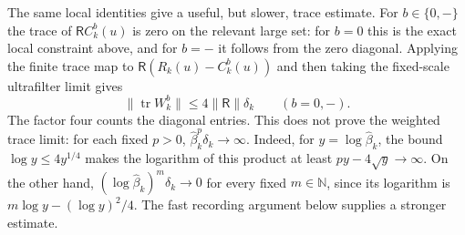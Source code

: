 The same local identities give a useful, but slower, trace estimate. For
$b\in\{0,-\}$ the trace of $\mathsf R C^b_k(u)$ is zero on the relevant
large set: for $b=0$ this is the exact local constraint above, and for
$b=-$ it follows from the zero diagonal. Applying the finite trace map to
$\mathsf R(R_k(u)-C^b_k(u))$ and then taking the fixed-scale ultrafilter
limit gives
\[
 \|\operatorname{tr}W^b_k\|\le4\|\mathsf R\|\delta_k
\qquad(b=0,-).
\]
The factor four counts the diagonal entries. This does not prove the weighted trace limit:
for each fixed $p>0$, $\widehat\beta_k^p\delta_k\to\infty$. Indeed, for
$y=\log\widehat\beta_k$, the bound $\log y\le4y^{1/4}$ makes the logarithm
of this product at least $py-4\sqrt y\to\infty$. On the other hand,
$(\log\widehat\beta_k)^m\delta_k\to0$ for every fixed $m\in\mathbb N$, since its
logarithm is $m\log y-(\log y)^2/4$. The fast recording argument below
supplies a stronger estimate.

